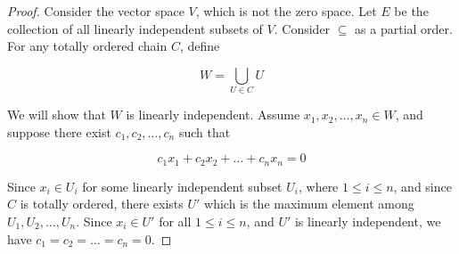 \begin{proof}
   Consider the vector space $V$, which is not the zero space. Let $E$ be the collection of  
   all linearly independent subsets of $V$. Consider $\subseteq$ as a partial order.
   For any totally ordered chain $C$, define 

   \[
        W = \bigcup_{U \in C} U
   \]

   We will show that $W$ is linearly independent. Assume $x_1, x_2, \dots, x_n \in W$, and suppose there exist $c_1,c_2,\dots, c_n$ such that

   \[
    c_1x_1 + c_2 x_2 + \dots + c_n x_n = 0
   \]

    Since $x_i \in U_i$ for some linearly independent subset $U_i$, where $1 \le i \le n$, 
    and since $C$ is totally ordered, there exists $U'$ which is the 
    maximum element among $U_1,U_2,\dots ,U_n$. Since $x_i \in U'$ for all $1 \le i \le n$, 
    and $U'$ is linearly independent, we have $c_1 = c_2 = \dots = c_n = 0$.

\end{proof}